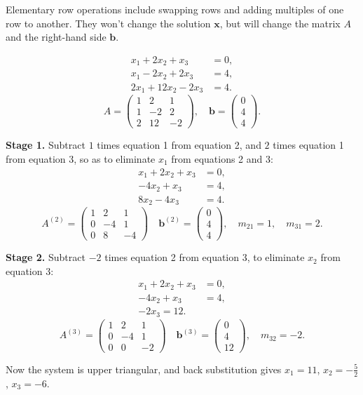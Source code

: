 \documentclass[
  letterpaper,
  DIV=11,
  numbers=noendperiod]{scrreprt}
\newenvironment{fbxSimple}[3]{\begin{tcolorbox}[enhanced, breakable,%
attach boxed title to top*={xshift=1.4pt},
boxed title style={boxrule=0.0mm, fuzzy shadow={1pt}{-1pt}{0mm}{0.1mm}{gray}, arc=.3em, rounded corners=east, sharp corners=west}, colframe=#1-color2, colbacktitle=#1-color1, colback = white, coltitle=black,  titlerule=0mm, toprule=0pt, bottomrule=.7pt, leftrule=.3em, rightrule=.7pt, outer arc=.3em,  	left=.5em, right=.5em, bottomtitle=1mm, toptitle=1mm,title=\textbf{#2}\hspace{0.5em}{#3}]}
{\end{tcolorbox}}
\begin{document}
Elementary row operations include swapping rows and adding multiples of
one row to another. They won't change the solution \(\mathbf{x}\), but
will change the matrix \(A\) and the right-hand side \(\mathbf{b}\).

\label{eg-3.3}
\begin{fbxSimple}{eg}{Example 3.3: }{Transform to upper triangular form the system}
\label{eg-3.3}
\[
\begin{aligned}
x_1 + 2x_2 + x_3 &= 0,\\
x_1 - 2x_2 + 2x_3 &= 4,\\
2x_1 + 12x_2 - 2x_3 &= 4.
\end{aligned}
\] \[
A=\begin{pmatrix}
1 & 2 & 1\\
1 & -2 & 2\\
2 & 12 & -2
\end{pmatrix},
\quad
\mathbf{b}=\begin{pmatrix}
0\\ 4\\ 4
\end{pmatrix}.
\]

\textbf{Stage 1.} Subtract \(1\) times equation 1 from equation 2, and
\(2\) times equation 1 from equation 3, so as to eliminate \(x_1\) from
equations 2 and 3: \[
\begin{aligned}
x_1 + 2x_2 + x_3 &= 0,\\
-4x_2 + x_3 &= 4,\\
8x_2 - 4x_3 &= 4.
\end{aligned}
\] \[
A^{(2)}=\begin{pmatrix}
1 & 2 & 1\\
0 & -4 & 1\\
0 & 8 & -4
\end{pmatrix}
\quad
\mathbf{b}^{(2)}=\begin{pmatrix}
0\\ 4\\ 4
\end{pmatrix},
\quad m_{21}=1, \quad m_{31}=2.
\]

\textbf{Stage 2.} Subtract \(-2\) times equation 2 from equation 3, to
eliminate \(x_2\) from equation 3: \[
\begin{aligned}
x_1 + 2x_2 + x_3 &= 0,\\
-4x_2 + x_3 &= 4,\\
-2x_3 = 12.
\end{aligned}
\] \[
A^{(3)}=\begin{pmatrix}
1 & 2 & 1\\
0 & -4 & 1\\
0 & 0 & -2
\end{pmatrix}
\quad
\mathbf{b}^{(3)}=\begin{pmatrix}
0\\ 4\\ 12
\end{pmatrix},
\quad m_{32}=-2.
\]

Now the system is upper triangular, and back substitution gives
\(x_1=11\), \(x_2=-\tfrac{5}{2}\), \(x_3=-6\).

\end{fbxSimple}
\end{document}

